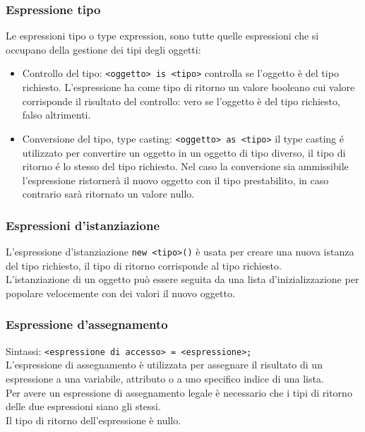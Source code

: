 \subsubsection{Espressione tipo}
Le espressioni tipo o type expression, sono tutte quelle espressioni che si occupano della 
gestione dei tipi degli oggetti:
\begin{itemize}
    \item
    {
        Controllo del tipo: \lstinline|<oggetto> is <tipo>| controlla se l'oggetto è del tipo richiesto.
        L'espressione ha come tipo di ritorno un valore booleano cui valore corrisponde il risultato del controllo:
        vero se l'oggetto è del tipo richiesto, falso altrimenti.
    }
    \item 
    {
        Conversione del tipo, type casting: \lstinline|<oggetto> as <tipo>| il type casting é utilizzato
        per convertire un oggetto in un oggetto di tipo diverso, il tipo di ritorno é lo stesso del tipo richiesto.
        Nel caso la conversione sia ammissibile l'espressione ristornerà il nuovo oggetto con il tipo prestabilito,
        in caso contrario sarà ritornato un valore nullo.
    }
\end{itemize}

\subsubsection{Espressioni d'istanziazione}
L'espressione d'istanziazione \lstinline|new <tipo>()| è usata per creare una nuova istanza del tipo
richiesto, il tipo di ritorno corrisponde al tipo richiesto.
\\
L'istanziazione di un oggetto può essere seguita da una lista d'inizializzazione per popolare 
velocemente con dei valori il nuovo oggetto.

\subsubsection{Espressione d'assegnamento}
Sintassi: \lstinline|<espressione di accesso> = <espressione>;| \\
L'espressione di assegnamento è utilizzata per assegnare il risultato di un espressione
a una variabile, attributo o a uno specifico indice di una lista. \\
Per avere un espressione di assegnamento legale è necessario che i tipi di ritorno
delle due espressioni siano gli stessi. \\
Il tipo di ritorno dell'espressione è nullo.

